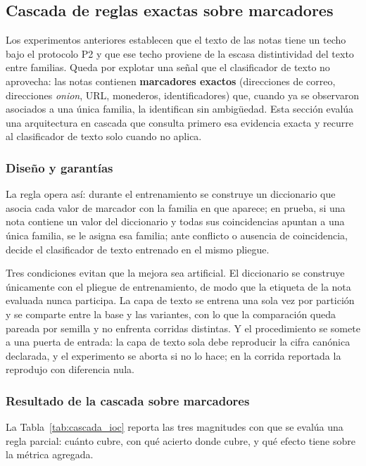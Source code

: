 \subsection{Cascada de reglas exactas sobre marcadores}
\label{subsec:res_cascadas}

Los experimentos anteriores establecen que el texto de las notas tiene un techo bajo el protocolo P2 y que ese techo proviene de la escasa distintividad del texto entre familias. Queda por explotar una señal que el clasificador de texto no aprovecha: las notas contienen \textbf{marcadores exactos} (direcciones de correo, direcciones \textit{onion}, URL, monederos, identificadores) que, cuando ya se observaron asociados a una única familia, la identifican sin ambigüedad. Esta sección evalúa una arquitectura en cascada que consulta primero esa evidencia exacta y recurre al clasificador de texto solo cuando no aplica.

\subsubsection*{Diseño y garantías}

La regla opera así: durante el entrenamiento se construye un diccionario que asocia cada valor de marcador con la familia en que aparece; en prueba, si una nota contiene un valor del diccionario y todas sus coincidencias apuntan a una única familia, se le asigna esa familia; ante conflicto o ausencia de coincidencia, decide el clasificador de texto entrenado en el mismo pliegue.

Tres condiciones evitan que la mejora sea artificial. El diccionario se construye únicamente con el pliegue de entrenamiento, de modo que la etiqueta de la nota evaluada nunca participa. La capa de texto se entrena una sola vez por partición y se comparte entre la base y las variantes, con lo que la comparación queda pareada por semilla y no enfrenta corridas distintas. Y el procedimiento se somete a una puerta de entrada: la capa de texto sola debe reproducir la cifra canónica declarada, y el experimento se aborta si no lo hace; en la corrida reportada la reprodujo con diferencia nula.

\subsubsection*{Resultado de la cascada sobre marcadores}

La Tabla~\ref{tab:cascada_ioc} reporta las tres magnitudes con que se evalúa una regla parcial: cuánto cubre, con qué acierto donde cubre, y qué efecto tiene sobre la métrica agregada.

